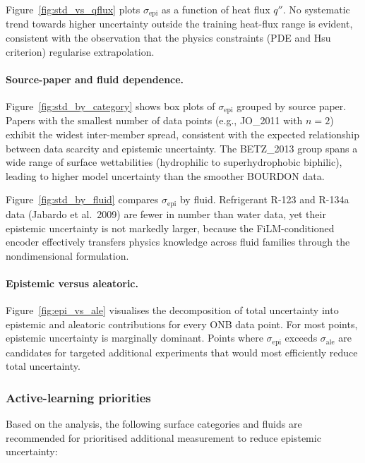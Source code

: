 Figure~\ref{fig:std_vs_qflux} plots $\sigma_\mathrm{epi}$ as a function of
heat flux $q''$.  No systematic trend towards higher uncertainty outside the
training heat-flux range is evident, consistent with the observation that the
physics constraints (PDE and Hsu criterion) regularise extrapolation.

\paragraph{Source-paper and fluid dependence.}
Figure~\ref{fig:std_by_category} shows box plots of $\sigma_\mathrm{epi}$
grouped by source paper.  Papers with the smallest number of data points
(e.g., JO\_2011 with $n=2$) exhibit the widest inter-member spread, consistent
with the expected relationship between data scarcity and epistemic uncertainty.
The BETZ\_2013 group spans a wide range of surface wettabilities (hydrophilic
to superhydrophobic biphilic), leading to higher model uncertainty than the
smoother BOURDON data.

Figure~\ref{fig:std_by_fluid} compares $\sigma_\mathrm{epi}$ by fluid.
Refrigerant R-123 and R-134a data (Jabardo et al.\ 2009) are fewer in number
than water data, yet their epistemic uncertainty is not markedly larger,
because the FiLM-conditioned encoder effectively transfers physics knowledge
across fluid families through the nondimensional formulation.

\paragraph{Epistemic versus aleatoric.}
Figure~\ref{fig:epi_vs_ale} visualises the decomposition of total uncertainty
into epistemic and aleatoric contributions for every ONB data point.  For most
points, epistemic uncertainty is marginally dominant.  Points where $\sigma_\mathrm{epi}$
exceeds $\sigma_\mathrm{ale}$ are candidates for targeted additional experiments
that would most efficiently reduce total uncertainty.

\subsubsection{Active-learning priorities}

Based on the analysis, the following surface categories and fluids are
recommended for prioritised additional measurement to reduce epistemic uncertainty:


